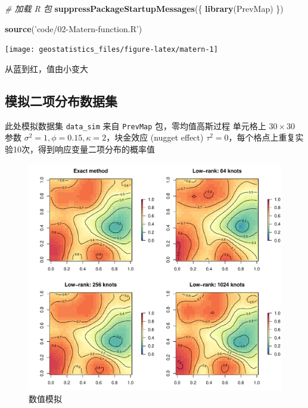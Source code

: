 \documentclass[]{article}
\newenvironment{Shaded}{\begin{snugshade}}{\end{snugshade}}
\newcommand{\KeywordTok}[1]{\textcolor[rgb]{0.13,0.29,0.53}{\textbf{#1}}}
\newcommand{\StringTok}[1]{\textcolor[rgb]{0.31,0.60,0.02}{#1}}
\newcommand{\CommentTok}[1]{\textcolor[rgb]{0.56,0.35,0.01}{\textit{#1}}}
\newcommand{\NormalTok}[1]{#1}
\begin{document}
\begin{Shaded}
\begin{Highlighting}[]
\CommentTok{# 加载 R 包}
\KeywordTok{suppressPackageStartupMessages}\NormalTok{(\{}
  \KeywordTok{library}\NormalTok{(PrevMap)}
\NormalTok{\})}
\end{Highlighting}
\end{Shaded}

\begin{Shaded}
\begin{Highlighting}[]
\KeywordTok{source}\NormalTok{(}\StringTok{'code/02-Matern-function.R'}\NormalTok{) }
\end{Highlighting}
\end{Shaded}

\begin{center}\texttt{[image: geostatistics\_files/figure-latex/matern-1]} \end{center}

从蓝到红，值由小变大

\subsection{模拟二项分布数据集}

此处模拟数据集 \texttt{data\_sim} 来自 \texttt{PrevMap}
包，零均值高斯过程 单元格上 \(30 \times 30\) 参数
\(\sigma^2 = 1, \phi = 0.15, \kappa = 2\)，块金效应 (nugget effect)
\(\tau^2 = 0\)，每个格点上重复实验10次，得到响应变量二项分布的概率值

\begin{figure}[!htb]

{\centering \includegraphics[width=.7\textwidth]{figure/simulation} 

}

\caption{数值模拟}\label{fig:low-rank}
\end{figure}

\renewcommand\refname{参考文献}

\end{document}
